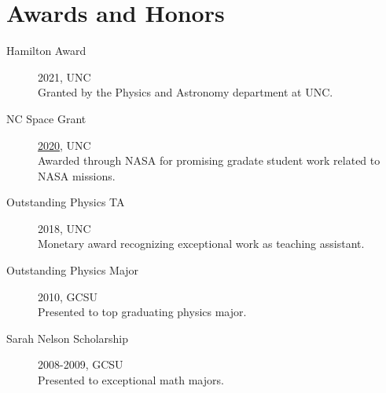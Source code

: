 \documentclass[11pt]{article}
\begin{document}
\section*{Awards and Honors}
\begin{minipage}{\textwidth}
	\begin{description}
		\item[Hamilton Award] 2021, UNC\\
			Granted by the Physics and Astronomy department at UNC.
		\item[NC Space Grant] \href{https://ncspacegrant.ncsu.edu/events/2021-space-symposium/nc-space-symposium-presentations/astronomy-astrophysics/}{2020}, UNC\\
			Awarded through NASA for promising gradate student work related to NASA missions.
		\item[Outstanding Physics TA] 2018, UNC\\
			Monetary award recognizing exceptional work as teaching assistant.
		\item[Outstanding Physics Major] 2010, GCSU\\
			Presented to top graduating physics major.
		\item[Sarah Nelson Scholarship] 2008-2009, GCSU\\
			Presented to exceptional math majors.
	\end{description}
\end{minipage}
\end{document}
